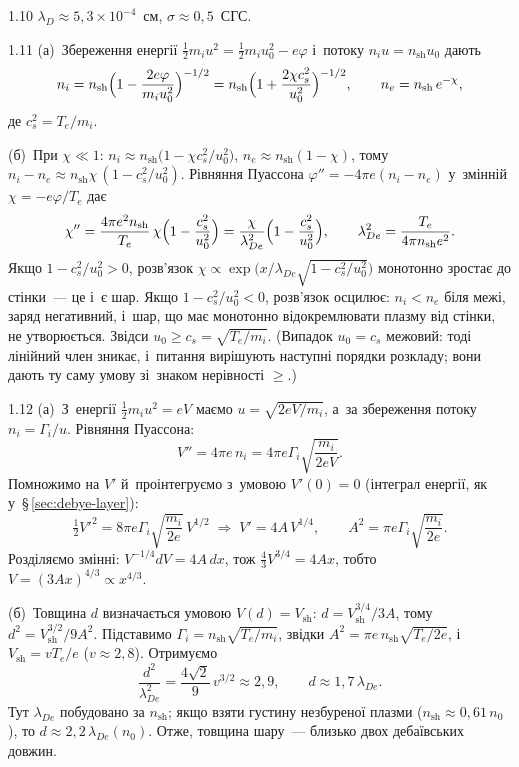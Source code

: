 \begin{Solution}{1.{10}}
		$\lambda_D\approx5{,}3\times10^{-4}$~см, $\sigma\approx0{,}5$~СГС.
	
\end{Solution}
\begin{Solution}{1.{11}}
		(а)~Збереження енергії $\tfrac12m_iu^2=\tfrac12m_iu_0^2-e\varphi$ і~потоку
		$n_iu=n_\mathrm{sh}u_0$ дають
		\[ n_i=n_\mathrm{sh}\Bigl(1-\frac{2e\varphi}{m_iu_0^2}\Bigr)^{-1/2}
		=n_\mathrm{sh}\Bigl(1+\frac{2\chi c_s^2}{u_0^2}\Bigr)^{-1/2},\qquad
		n_e=n_\mathrm{sh}\,e^{-\chi}, \]
		де $c_s^2=T_e/m_i$.

		(б)~При $\chi\ll1$: $n_i\approx n_\mathrm{sh}\bigl(1-\chi c_s^2/u_0^2\bigr)$,
		$n_e\approx n_\mathrm{sh}(1-\chi)$, тому
		$n_i-n_e\approx n_\mathrm{sh}\chi\,(1-c_s^2/u_0^2)$. Рівняння Пуассона
		$\varphi''=-4\pi e(n_i-n_e)$ у~змінній $\chi=-e\varphi/T_e$ дає
		\[ \chi''=\frac{4\pi e^2n_\mathrm{sh}}{T_e}\,\chi\Bigl(1-\frac{c_s^2}{u_0^2}\Bigr)
		=\frac{\chi}{\lambda_{De}^2}\Bigl(1-\frac{c_s^2}{u_0^2}\Bigr),\qquad
		\lambda_{De}^2=\frac{T_e}{4\pi n_\mathrm{sh}e^2}. \]
		Якщо $1-c_s^2/u_0^2>0$, розв'язок $\chi\propto\exp\bigl(x/\lambda_{De}\sqrt{1-c_s^2/u_0^2}\bigr)$
		монотонно зростає до стінки~--- це і~є шар. Якщо $1-c_s^2/u_0^2<0$, розв'язок
		осцилює: $n_i<n_e$ біля межі, заряд негативний, і~шар, що має монотонно відокремлювати плазму від стінки,
		не утворюється. Звідси $u_0\ge c_s=\sqrt{T_e/m_i}$. (Випадок $u_0=c_s$ межовий: тоді лінійний член
		зникає, і~питання вирішують наступні порядки розкладу; вони дають ту саму умову зі~знаком
		нерівності $\ge$.)
	
\end{Solution}
\begin{Solution}{1.{12}}
		(а)~З~енергії $\tfrac12m_iu^2=eV$ маємо $u=\sqrt{2eV/m_i}$, а~за збереження потоку
		$n_i=\Gamma_i/u$. Рівняння Пуассона:
		\[ V''=4\pi e\,n_i=4\pi e\Gamma_i\sqrt{\frac{m_i}{2eV}}. \]
		Помножимо на $V'$ й~проінтегруємо з~умовою $V'(0)=0$ (інтеграл енергії, як у~§\,\ref{sec:debye-layer}):
		\[ \tfrac12V'^2=8\pi e\Gamma_i\sqrt{\frac{m_i}{2e}}\,V^{1/2}
		\;\Rightarrow\; V'=4A\,V^{1/4},\qquad A^2=\pi e\Gamma_i\sqrt{\frac{m_i}{2e}}. \]
		Розділяємо змінні: $V^{-1/4}dV=4A\,dx$, тож $\tfrac43V^{3/4}=4Ax$, тобто
		$V=(3Ax)^{4/3}\propto x^{4/3}$.

		(б)~Товщина $d$ визначається умовою $V(d)=V_\mathrm{sh}$: $d=V_\mathrm{sh}^{3/4}/3A$, тому
		$d^2=V_\mathrm{sh}^{3/2}/9A^2$. Підставимо $\Gamma_i=n_\mathrm{sh}\sqrt{T_e/m_i}$, звідки
		$A^2=\pi e\,n_\mathrm{sh}\sqrt{T_e/2e}$, і~$V_\mathrm{sh}=vT_e/e$ ($v\approx2{,}8$). Отримуємо
		\[ \frac{d^2}{\lambda_{De}^2}=\frac{4\sqrt2}{9}\,v^{3/2}\approx2{,}9,
		\qquad d\approx1{,}7\,\lambda_{De}. \]
		Тут $\lambda_{De}$ побудовано за $n_\mathrm{sh}$; якщо взяти густину незбуреної плазми
		($n_\mathrm{sh}\approx0{,}61\,n_0$), то $d\approx2{,}2\,\lambda_{De}(n_0)$. Отже,
		товщина шару~--- близько двох дебаївських довжин.
	
\end{Solution}
